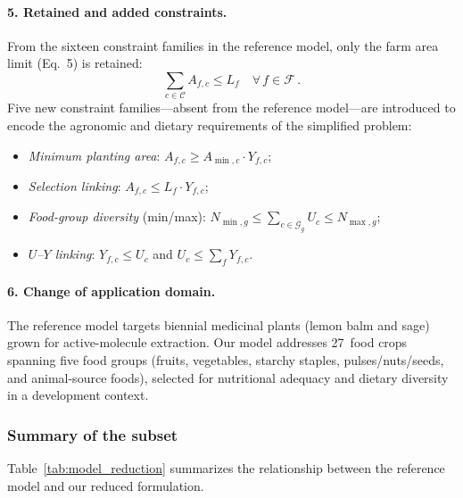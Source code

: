 \documentclass{oqireport}
\begin{document}
\paragraph{5. Retained and added constraints.}
From the sixteen constraint families in the reference model, only the farm area limit (Eq.~5) is retained:
\begin{equation}
    \sum_{c \in \mathcal{C}} A_{f,c} \leq L_f \quad \forall\, f \in \mathcal{F}\,.
    \label{eq:land_avail}
\end{equation}
Five new constraint families---absent from the reference model---are introduced to encode the agronomic and dietary requirements of the simplified problem:
\begin{itemize}
    \item \emph{Minimum planting area}: $A_{f,c} \geq A_{\min,c}\cdot Y_{f,c}$;
    \item \emph{Selection linking}: $A_{f,c} \leq L_f \cdot Y_{f,c}$;
    \item \emph{Food-group diversity} (min/max): $N_{\min,g} \leq \sum_{c \in \mathcal{G}_g} U_c \leq N_{\max,g}$;
    \item \emph{$U$--$Y$ linking}: $Y_{f,c} \leq U_c$ and $U_c \leq \sum_{f} Y_{f,c}$.
\end{itemize}

\paragraph{6. Change of application domain.}
The reference model targets biennial medicinal plants (lemon balm and sage) grown for active-molecule extraction. Our model addresses 27~food crops spanning five food groups (fruits, vegetables, starchy staples, pulses/nuts/seeds, and animal-source foods), selected for nutritional adequacy and dietary diversity in a development context.

\subsubsection{Summary of the subset}
Table~\ref{tab:model_reduction} summarizes the relationship between the reference model and our reduced formulation.
\end{document}
